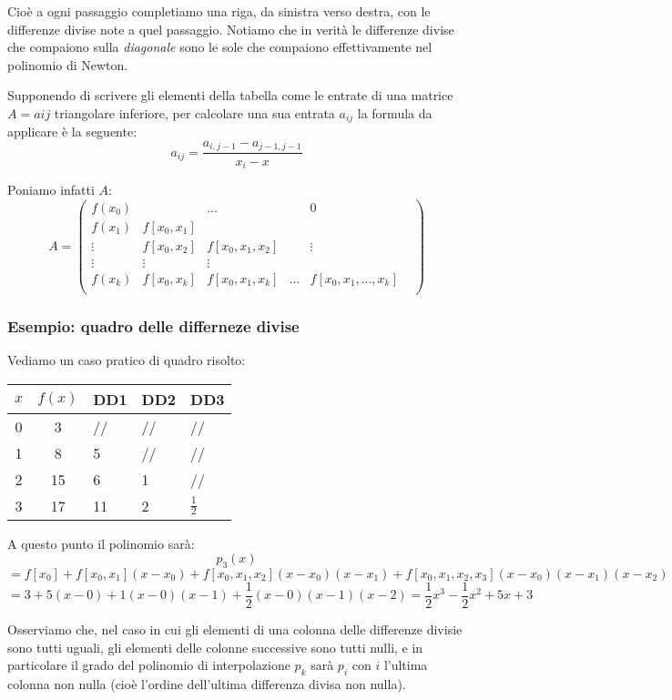 \documentclass[a4paper,11pt]{article}
\begin{document}
Cioè a ogni passaggio completiamo una riga, da sinistra verso destra, con le differenze divise note a quel passaggio.
Notiamo che in verità le differenze divise che compaiono sulla \textit{diagonale} sono le sole che compaiono effettivamente nel polinomio di Newton.


Supponendo di scrivere gli elementi della tabella come le entrate di una matrice $A = a{ij}$ triangolare inferiore, per calcolare una sua entrata $a_{ij}$ la formula da applicare è la seguente:
$$
a_{ij} = \frac{a_{i, j - 1} - a_{j - 1, j - 1}}{x_i - x}
$$

Poniamo infatti $A$:
$$
A = 
\begin{pmatrix}
	f(x_0) & & ... & & 0 \\
	f(x_1) & f[x_0, x_1] & & & & \\
	\vdots & f[x_0, x_2] & f[x_0, x_1, x_2] & & \vdots \\
	\vdots & \vdots & \vdots & & & \\
	f(x_k) &  f[x_0, x_k] & f[x_0, x_1, x_k] & ... & f[x_0, x_1, ..., x_k] \\
\end{pmatrix}
$$

\subsubsection{Esempio: quadro delle differneze divise}
Vediamo un caso pratico di quadro risolto:
\begin{table}[H]
	\center 
	\begin{tabular} { c | c | p{1cm}  p{1cm} p{1cm} }
		$x$ & $f(x)$ & DD1 & DD2 & DD3 \\
		\hline
		0 & 3 & // & // & // \\
		1 & 8 & 5 & // & // \\
		2 & 15 & 6 & 1 & // \\
		3 & 17 & 11 & 2 & $\frac{1}{2}$ \\
	\end{tabular}
\end{table}

A questo punto il polinomio sarà:
$$
p_3(x)
$$
$$
= f[x_0] + f[x_0, x_1] (x - x_0) + f[x_0, x_1, x_2] (x - x_0) (x - x_1) + f[x_0, x_1, x_2, x_3] (x - x_0) (x - x_1) (x - x_2) 
$$
$$
= 3 + 5 ( x - 0 ) + 1 ( x - 0 ) ( x - 1 ) + \frac{1}{2} ( x - 0 ) ( x - 1 ) ( x - 2 ) = \frac{1}{2}x^3 - \frac{1}{2}x^2 + 5x + 3
$$

Osserviamo che, nel caso in cui gli elementi di una colonna delle differenze divisie sono tutti uguali, gli elementi delle colonne successive sono tutti nulli, e in particolare il grado del polinomio di interpolazione $p_k$ sarà $p_i$ con $i$ l'ultima colonna non nulla (cioè l'ordine dell'ultima differenza divisa non nulla). 
\end{document}
